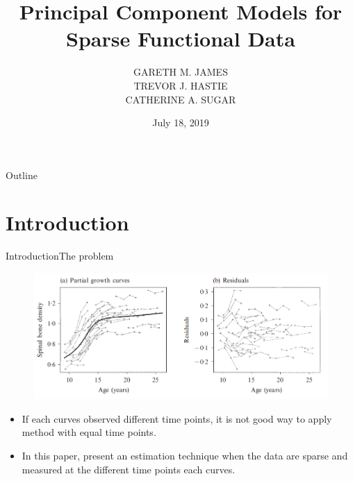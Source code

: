 \documentclass{beamer}
\title{Principal Component Models for Sparse Functional Data}
\date[Short Occasion]{July 18, 2019}
\author{GARETH M. JAMES\\ TREVOR J. HASTIE\\ CATHERINE A. SUGAR}
\subtitle{}
\begin{document}
\begin{frame}
  \titlepage
\end{frame}

\begin{frame}{Outline}
  \tableofcontents
\end{frame}

\section{Introduction}


\begin{frame}{Introduction}{The problem}
	\begin{figure}[h] %
		\begin{center}
			\includegraphics[width=0.7\linewidth]{img/1.png}
		\end{center}
		\label{fig:long}
		\label{fig:onecol}
	\end{figure}	
  \begin{itemize}
  	\item {
	    If each curves observed different time points, it is not good way to apply method with equal time points.
	}
	\item {
		In this paper, present an estimation technique when the data are sparse and measured at the different time points each curves.
	}	
  \end{itemize}
\end{frame}
\end{document}
